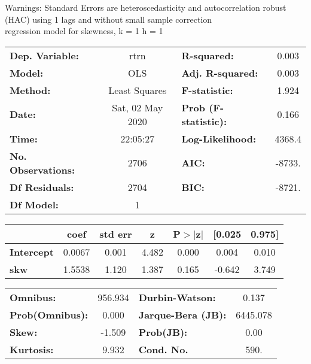 Warnings: \newline
 [1] Standard Errors are heteroscedasticity and autocorrelation robust (HAC) using 1 lags and without small sample correction\\ 

regression model for skewness, k = 1 h = 1\begin{center}
\begin{tabular}{lclc}
\toprule
\textbf{Dep. Variable:}    &       rtrn       & \textbf{  R-squared:         } &     0.003   \\
\textbf{Model:}            &       OLS        & \textbf{  Adj. R-squared:    } &     0.003   \\
\textbf{Method:}           &  Least Squares   & \textbf{  F-statistic:       } &     1.924   \\
\textbf{Date:}             & Sat, 02 May 2020 & \textbf{  Prob (F-statistic):} &    0.166    \\
\textbf{Time:}             &     22:05:27     & \textbf{  Log-Likelihood:    } &    4368.4   \\
\textbf{No. Observations:} &        2706      & \textbf{  AIC:               } &    -8733.   \\
\textbf{Df Residuals:}     &        2704      & \textbf{  BIC:               } &    -8721.   \\
\textbf{Df Model:}         &           1      & \textbf{                     } &             \\
\bottomrule
\end{tabular}
\begin{tabular}{lcccccc}
                   & \textbf{coef} & \textbf{std err} & \textbf{z} & \textbf{P$> |$z$|$} & \textbf{[0.025} & \textbf{0.975]}  \\
\midrule
\textbf{Intercept} &       0.0067  &        0.001     &     4.482  &         0.000        &        0.004    &        0.010     \\
\textbf{skw}       &       1.5538  &        1.120     &     1.387  &         0.165        &       -0.642    &        3.749     \\
\bottomrule
\end{tabular}
\begin{tabular}{lclc}
\textbf{Omnibus:}       & 956.934 & \textbf{  Durbin-Watson:     } &    0.137  \\
\textbf{Prob(Omnibus):} &   0.000 & \textbf{  Jarque-Bera (JB):  } & 6445.078  \\
\textbf{Skew:}          &  -1.509 & \textbf{  Prob(JB):          } &     0.00  \\
\textbf{Kurtosis:}      &   9.932 & \textbf{  Cond. No.          } &     590.  \\
\bottomrule
\end{tabular}
\end{center}

